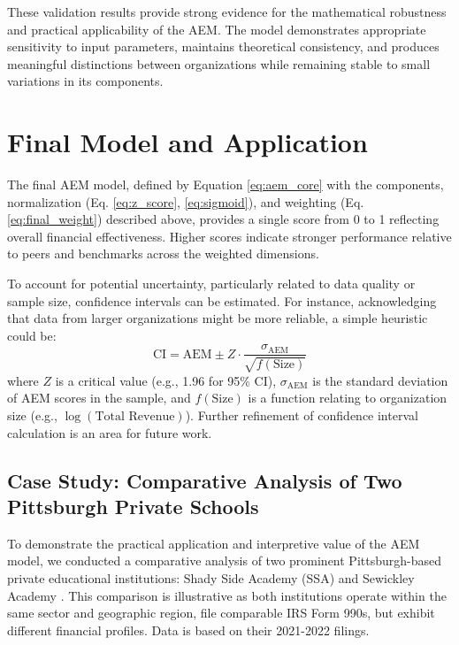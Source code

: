 \documentclass[12pt]{article}
\begin{document}
These validation results provide strong evidence for the mathematical robustness and practical applicability of the AEM. The model demonstrates appropriate sensitivity to input parameters, maintains theoretical consistency, and produces meaningful distinctions between organizations while remaining stable to small variations in its components.

\section{Final Model and Application} %
The final AEM model, defined by Equation \ref{eq:aem_core} with the components, normalization (Eq. \ref{eq:z_score}, \ref{eq:sigmoid}), and weighting (Eq. \ref{eq:final_weight}) described above, provides a single score from 0 to 1 reflecting overall financial effectiveness. Higher scores indicate stronger performance relative to peers and benchmarks across the weighted dimensions.

To account for potential uncertainty, particularly related to data quality or sample size, confidence intervals can be estimated. For instance, acknowledging that data from larger organizations might be more reliable, a simple heuristic could be:
\begin{equation} \label{eq:confidence_interval}
    \text{CI} = \text{AEM} \pm Z \cdot \frac{\sigma_{\text{AEM}}}{\sqrt{f(\text{Size})}}
\end{equation}
where $Z$ is a critical value (e.g., 1.96 for 95\% CI), $\sigma_{\text{AEM}}$ is the standard deviation of AEM scores in the sample, and $f(\text{Size})$ is a function relating to organization size (e.g., $\log(\text{Total Revenue})$). Further refinement of confidence interval calculation is an area for future work.

\subsection{Case Study: Comparative Analysis of Two Pittsburgh Private Schools} %
To demonstrate the practical application and interpretive value of the AEM model, we conducted a comparative analysis of two prominent Pittsburgh-based private educational institutions: Shady Side Academy (SSA) and Sewickley Academy \cite{ssa_990,sewickley_990}. This comparison is illustrative as both institutions operate within the same sector and geographic region, file comparable IRS Form 990s, but exhibit different financial profiles. Data is based on their 2021-2022 filings.
\end{document}
